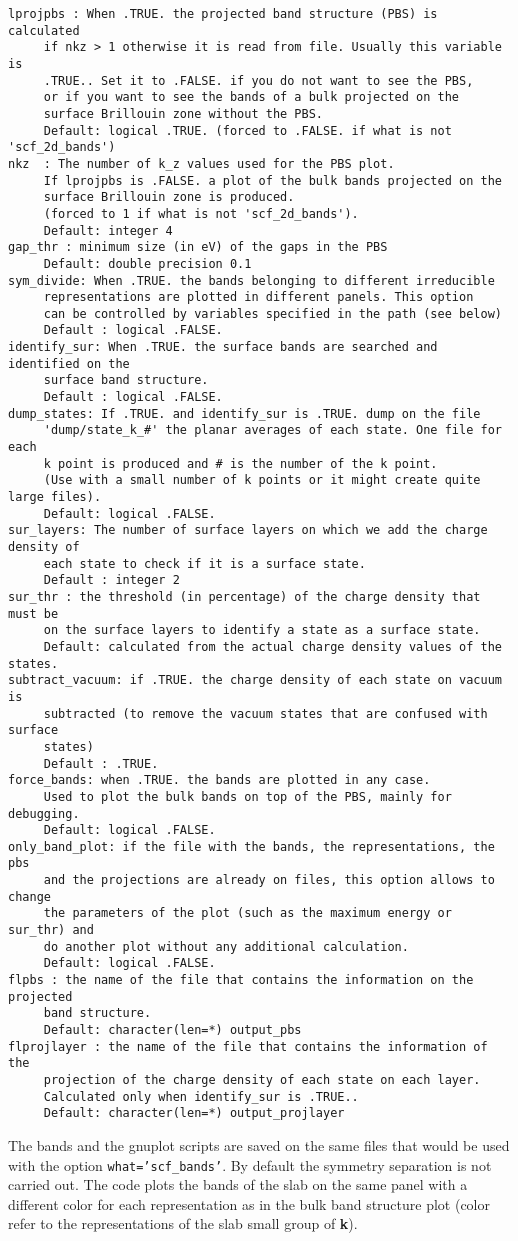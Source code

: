 \documentclass[12pt,a4paper]{article}
\begin{document}
\begin{verbatim}
lprojpbs : When .TRUE. the projected band structure (PBS) is calculated 
     if nkz > 1 otherwise it is read from file. Usually this variable is
     .TRUE.. Set it to .FALSE. if you do not want to see the PBS, 
     or if you want to see the bands of a bulk projected on the 
     surface Brillouin zone without the PBS.
     Default: logical .TRUE. (forced to .FALSE. if what is not 'scf_2d_bands')
nkz  : The number of k_z values used for the PBS plot. 
     If lprojpbs is .FALSE. a plot of the bulk bands projected on the 
     surface Brillouin zone is produced.
     (forced to 1 if what is not 'scf_2d_bands').
     Default: integer 4
gap_thr : minimum size (in eV) of the gaps in the PBS
     Default: double precision 0.1
sym_divide: When .TRUE. the bands belonging to different irreducible 
     representations are plotted in different panels. This option
     can be controlled by variables specified in the path (see below)
     Default : logical .FALSE.
identify_sur: When .TRUE. the surface bands are searched and identified on the
     surface band structure. 
     Default : logical .FALSE.
dump_states: If .TRUE. and identify_sur is .TRUE. dump on the file 
     'dump/state_k_#' the planar averages of each state. One file for each 
     k point is produced and # is the number of the k point.
     (Use with a small number of k points or it might create quite large files).
     Default: logical .FALSE.
sur_layers: The number of surface layers on which we add the charge density of 
     each state to check if it is a surface state.
     Default : integer 2
sur_thr : the threshold (in percentage) of the charge density that must be
     on the surface layers to identify a state as a surface state.
     Default: calculated from the actual charge density values of the states.
subtract_vacuum: if .TRUE. the charge density of each state on vacuum is
     subtracted (to remove the vacuum states that are confused with surface
     states)
     Default : .TRUE.
force_bands: when .TRUE. the bands are plotted in any case.
     Used to plot the bulk bands on top of the PBS, mainly for debugging.
     Default: logical .FALSE.
only_band_plot: if the file with the bands, the representations, the pbs
     and the projections are already on files, this option allows to change
     the parameters of the plot (such as the maximum energy or sur_thr) and
     do another plot without any additional calculation.
     Default: logical .FALSE.
flpbs : the name of the file that contains the information on the projected
     band structure.
     Default: character(len=*) output_pbs
flprojlayer : the name of the file that contains the information of the
     projection of the charge density of each state on each layer.
     Calculated only when identify_sur is .TRUE..
     Default: character(len=*) output_projlayer
\end{verbatim}
The bands and the gnuplot scripts are saved on the same files that would
be used with the option \texttt{what='scf\_bands'}.
By default the symmetry separation is not carried out. The code plots the
bands of the slab on the same panel with a different color for each 
representation as in the bulk band structure plot (color refer to the 
representations of the slab small group of {\bf k}). 
\end{document}
